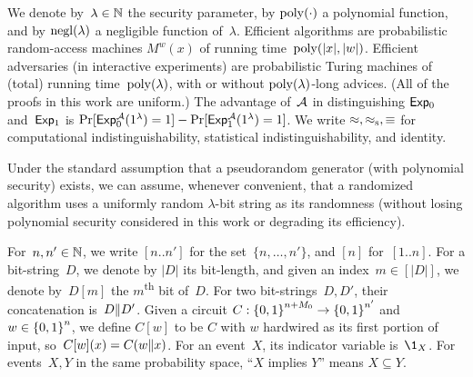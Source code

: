 We denote by~${\lambda\in{\mathbb{N}}}$ the security parameter,
by $\operatorname{poly}({\cdot})$ a polynomial function, and
by $\operatorname{negl}(\lambda)$ a negligible function of~$\lambda$.
Efficient algorithms are probabilistic random-access machines $M^w(x)$ of running time~$\operatorname{poly}(|x|,|w|)$.
Efficient adversaries (in interactive experiments) are probabilistic Turing machines of (total) running time~$\operatorname{poly}(\lambda)$,
with or without $\operatorname{poly}(\lambda)$-long advices.
(All of the proofs in this work are uniform.)
The advantage of~${\mathcal{A}}$ in distinguishing ${\smash{\mathsf{Exp}}}_0$ and~${\smash{\mathsf{Exp}}}_1$ is
${\Pr[{\smash{\mathsf{Exp}}}_0^{\mathcal{A}}(1^\lambda)=1]-\Pr[{\smash{\mathsf{Exp}}}_1^{\mathcal{A}}(1^\lambda)=1]}$.
We write $\approx,\approx_{\textup{s}},\equiv$ for computational indistinguishability, statistical indistinguishability, and identity.

Under the standard assumption that a pseudorandom generator (with polynomial security) exists,
we can assume, whenever convenient, that a randomized algorithm uses a uniformly random $\lambda$-bit string as its randomness (without losing polynomial security considered in this work or degrading its efficiency).

For~${n,n'\in{\mathbb{N}}}$, we write $[n..n']$ for the set~$\{n,\dots,n'\}$,
and $[n]$ for~$[1..n]$.
For a bit-string~$D$, we denote by $|D|$ its bit-length,
and given an index~${m\in[|D|]}$, we denote by~$D[m]$ the $m$\textsuperscript{th} bit of~$D$.
For two bit-strings~$D,D'$, their concatenation is~${D{\parallel} D'}$.
Given a circuit ${C:{\{0,1\}}^{n+M_0}\to{\{0,1\}}^{n'}}$ and ${w\in{\{0,1\}}^n}$, we define $C[w]$ to be $C$ with $w$ hardwired as its first portion of input,
so~${C[w](x)=C(w{\parallel} x)}$.
For an event~$X$, its indicator variable is~$\1_X$.
For events~$X,Y$ in the same probability space, ``$X$ implies $Y$'' means ${X\subseteq Y}$.
